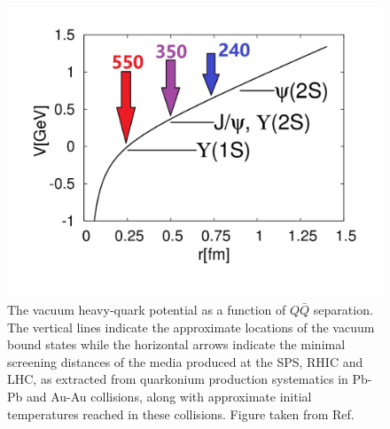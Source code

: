 \documentclass[../report.tex]{subfiles}
\begin{document}
\begin{figure}[!h]
\begin{center}
\includegraphics[width=0.6\columnwidth]{fig/in-med-pot.pdf}
\end{center}
\vspace{-0.5cm}
\caption{The vacuum heavy-quark potential as a function of $Q\bar Q$ separation. The vertical
lines indicate the approximate locations of the vacuum bound states while the horizontal arrows
indicate the minimal screening distances of the media produced at the SPS, RHIC and LHC, as 
extracted from quarkonium production systematics in Pb-Pb and Au-Au collisions, along with 
approximate initial temperatures reached in these collisions. 
Figure taken from Ref.~\cite{Rapp:2017chc}}
\label{fig_pot}
\end{figure}
\end{document}
